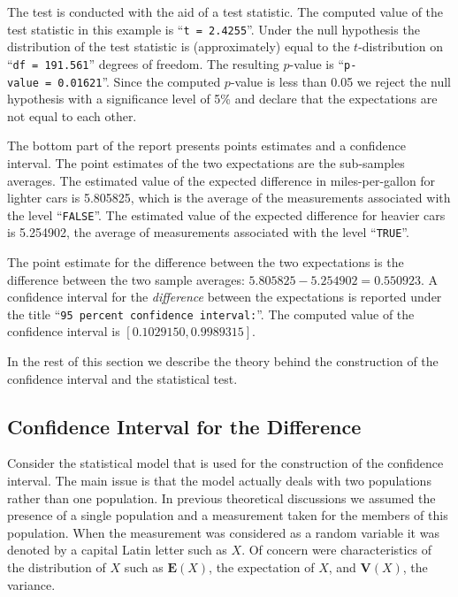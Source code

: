 \documentclass[
]{krantz}
\newcommand{\Expec}{\mathbf{E}}
\newcommand{\Var}{\mathbf{V}}
\theoremstyle{definition}
\theoremstyle{definition}
\theoremstyle{definition}
\theoremstyle{remark}
\begin{document}
The test is conducted with the aid of a test statistic. The computed
value of the test statistic in this example is ``\texttt{t\ =\ 2.4255}''. Under the
null hypothesis the distribution of the test statistic is
(approximately) equal to the \(t\)-distribution on ``\texttt{df\ =\ 191.561}''
degrees of freedom. The resulting \(p\)-value is ``\texttt{p-value\ =\ 0.01621}''.
Since the computed \(p\)-value is less than 0.05 we reject the null
hypothesis with a significance level of 5\% and declare that the
expectations are not equal to each other.

The bottom part of the report presents points estimates and a confidence
interval. The point estimates of the two expectations are the
sub-samples averages. The estimated value of the expected difference in
miles-per-gallon for lighter cars is 5.805825, which is the average of
the measurements associated with the level ``\texttt{FALSE}''. The estimated
value of the expected difference for heavier cars is 5.254902, the
average of measurements associated with the level ``\texttt{TRUE}''.

The point estimate for the difference between the two expectations is
the difference between the two sample averages:
\(5.805825 - 5.254902 = 0.550923\). A confidence interval for the
\emph{difference} between the expectations is reported under the title
``\texttt{95\ percent\ confidence\ interval:}''. The computed value of the
confidence interval is \([0.1029150, 0.9989315]\).

In the rest of this section we describe the theory behind the
construction of the confidence interval and the statistical test.

\hypertarget{confidence-interval-for-the-difference}{%
\subsection{Confidence Interval for the Difference}\label{confidence-interval-for-the-difference}}

Consider the statistical model that is used for the construction of the
confidence interval. The main issue is that the model actually deals
with two populations rather than one population. In previous theoretical
discussions we assumed the presence of a single population and a
measurement taken for the members of this population. When the
measurement was considered as a random variable it was denoted by a
capital Latin letter such as \(X\). Of concern were characteristics of the
distribution of \(X\) such as \(\Expec(X)\), the expectation of \(X\), and
\(\Var(X)\), the variance.
\end{document}

